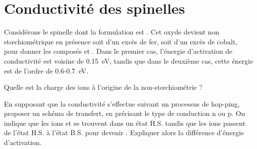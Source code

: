 \section{Conductivité des spinelles }

\setcounter{equation}{0}
\setcounter{Q}{0}

Considérons le spinelle  dont la formulation est . Cet oxyde devient non stœchiométrique en présence soit d’un excès de fer, soit d’un excès de cobalt, pour donner les composés  et . Dans le premier cas, l’énergie d'activation de conductivité est voisine de \SI{0.15}{\electronvolt}, tandis que dans le deuxième cas, cette énergie est de l’ordre de 0.6-\SI{0.7}{\electronvolt}.

\Q Quelle est la charge des ions à l’origine de la non-stœchiométrie ?

\Q En supposant que la conductivité s’effectue suivant un processus de hop-ping, proposer un schéma de transfert, en précisant le type de conduction n ou p. On indique que les ions  et  se trouvent dans un état H.S. tandis que les ions  passent de l’état H.S. à l’état B.S. pour devenir . Expliquer alors la différence d'énergie d’activation.
